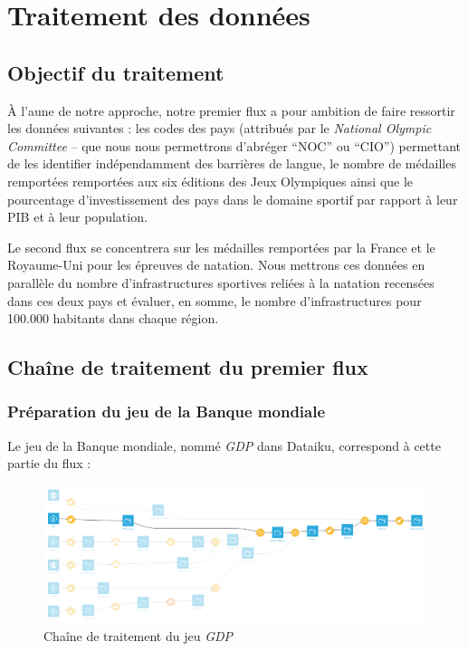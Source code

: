 \documentclass[hidelinks, 12pt]{report}
\begin{document}
%





\chapter{Traitement des données}

\section{Objectif du traitement}

À l'aune de notre approche, notre premier flux a pour ambition de faire ressortir les données suivantes : les codes des pays (attribués par le \textit{National Olympic Committee} -- que nous nous permettrons d'abréger \enquote{NOC} ou \enquote{CIO}) permettant de les identifier indépendamment des barrières de langue, le nombre de médailles remportées remportées aux six éditions des Jeux Olympiques ainsi que le pourcentage d'investissement des pays dans le domaine sportif par rapport à leur PIB et à leur population.

Le second flux se concentrera sur les médailles remportées par la France et le Royaume-Uni pour les épreuves de natation. Nous mettrons ces données en parallèle du nombre d'infrastructures sportives reliées à la natation recensées dans ces deux pays et évaluer, en somme, le nombre d'infrastructures pour 100.000 habitants dans chaque région.





%





\section{Chaîne de traitement du premier flux}

\subsection{Préparation du jeu de la Banque mondiale}

Le jeu de la Banque mondiale, nommé \textit{GDP} dans Dataiku, correspond à cette partie du flux :

\begin{center}
	\begin{figure}[H]
		\setlength{\belowcaptionskip}{-35pt}
		\includegraphics[scale=0.35]{images/flow-medals-gdp.png}
		\caption{Chaîne de traitement du jeu \textit{GDP}}
	\end{figure}
\end{center}
\end{document}
